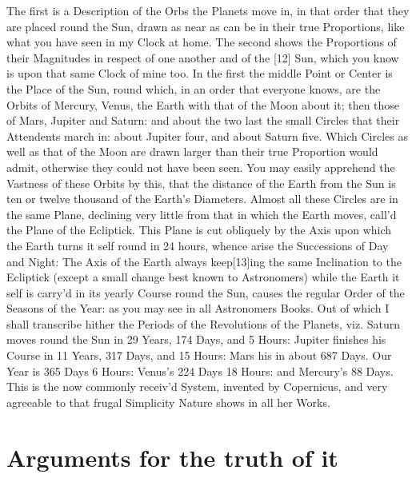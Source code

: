 \documentclass[letterpaper]{book}
\begin{document}
The first is a Description of the Orbs the Planets move
in, in that order that they are placed round the Sun, drawn as near as can
be in their true Proportions, like what you have seen in my Clock at home.
The second shows the Proportions of their Magnitudes in respect of one
another and of the [12] Sun, which you know is upon that same Clock of mine
too. In the first the middle Point or Center is the Place of the Sun, round
which, in an order that everyone knows, are the Orbits of Mercury, Venus,
the Earth with that of the Moon about it; then those of Mars, Jupiter and
Saturn: and about the two last the small Circles that their Attendents march
in: about Jupiter four, and about Saturn five. Which Circles as well as that
of the Moon are drawn larger than their true Proportion would admit,
otherwise they could not have been seen. You may easily apprehend the
Vastness of these Orbits by this, that the distance of the Earth from the
Sun is ten or twelve thousand of the Earth's Diameters. Almost all these
Circles are in the same Plane, declining very little from that in which the
Earth moves, call'd the Plane of the Ecliptick. This Plane is cut obliquely
by the Axis upon which the Earth turns it self round in 24 hours, whence
arise the Successions of Day and Night: The Axis of the Earth always
keep[13]ing the same Inclination to the Ecliptick (except a small change
best known to Astronomers) while the Earth it self is carry'd in its yearly
Course round the Sun, causes the regular Order of the Seasons of the Year:
as you may see in all Astronomers Books.  Out of which I shall transcribe
hither the Periods of the Revolutions of the Planets, viz. Saturn moves
round the Sun in 29 Years, 174 Days, and 5 Hours: Jupiter finishes his
Course in 11 Years, 317 Days, and 15 Hours: Mars his in about 687 Days. Our
Year is 365 Days 6 Hours: Venus's 224 Days 18 Hours: and Mercury's 88 Days.
This is the now commonly receiv'd System, invented by Copernicus, and very
agreeable to that frugal Simplicity Nature shows in all her Works.


\section{Arguments for the truth of it}
\end{document}

